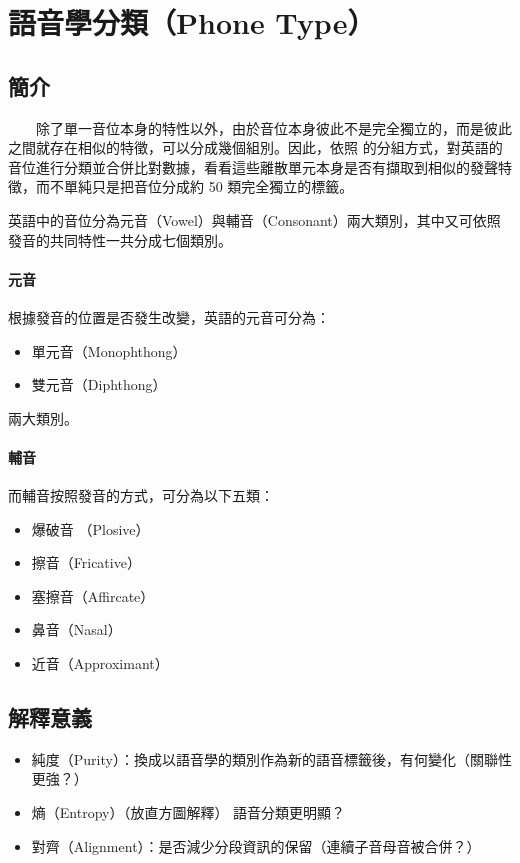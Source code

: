 \section{語音學分類（Phone Type）}

\subsection{簡介}

　　除了單一音位本身的特性以外，由於音位本身彼此不是完全獨立的，而是彼此之間就存在相似的特徵，可以分成幾個組別。因此，依照  的分組方式，對英語的音位進行分類並合併比對數據，看看這些離散單元本身是否有擷取到相似的發聲特徵，而不單純只是把音位分成約 50 類完全獨立的標籤。


        英語中的音位分為元音（Vowel）與輔音（Consonant）兩大類別，其中又可依照發音的共同特性一共分成七個類別。

\paragraph{元音}


根據發音的位置是否發生改變，英語的元音可分為：

\begin{itemize}
    \item 單元音（Monophthong）
    \item 雙元音（Diphthong）
\end{itemize}

兩大類別。

\paragraph{輔音}

而輔音按照發音的方式，可分為以下五類：

\begin{itemize}
    \item 爆破音 （Plosive）
    \item 擦音（Fricative）
    \item 塞擦音（Affircate）
    \item 鼻音（Nasal）
    \item 近音（Approximant）
\end{itemize}

\subsection{解釋意義}

\begin{itemize}
    \item 純度（Purity）：換成以語音學的類別作為新的語音標籤後，有何變化（關聯性更強？）
    \item 熵（Entropy）（放直方圖解釋） \rightarrow 語音分類更明顯？
    \item 對齊（Alignment）：是否減少分段資訊的保留（連續子音母音被合併？）
\end{itemize}

